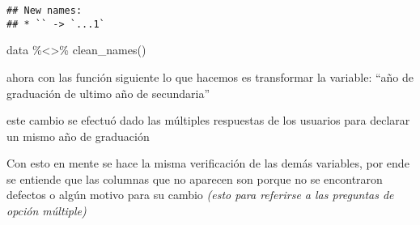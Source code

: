 \documentclass[
]{article}
\newenvironment{Shaded}{\begin{snugshade}}{\end{snugshade}}
\newcommand{\CommentTok}[1]{\textcolor[rgb]{0.56,0.35,0.01}{\textit{#1}}}
\newcommand{\FunctionTok}[1]{\textcolor[rgb]{0.00,0.00,0.00}{#1}}
\newcommand{\NormalTok}[1]{#1}
\newcommand{\OtherTok}[1]{\textcolor[rgb]{0.56,0.35,0.01}{#1}}
\newcommand{\SpecialCharTok}[1]{\textcolor[rgb]{0.00,0.00,0.00}{#1}}
\newcommand{\StringTok}[1]{\textcolor[rgb]{0.31,0.60,0.02}{#1}}
\begin{document}
\begin{verbatim}
## New names:
## * `` -> `...1`
\end{verbatim}

\begin{Shaded}
\begin{Highlighting}[]
\NormalTok{data }\SpecialCharTok{\%\textless{}\textgreater{}\%} \FunctionTok{clean\_names}\NormalTok{()}
\end{Highlighting}
\end{Shaded}

ahora con las función siguiente lo que hacemos es transformar la
variable: ``año de graduación de ultimo año de secundaria''

este cambio se efectuó dado las múltiples respuestas de los usuarios
para declarar un mismo año de graduación

\begin{Shaded}
\end{Shaded}

Con esto en mente se hace la misma verificación de las demás variables,
por ende se entiende que las columnas que no aparecen son porque no se
encontraron defectos o algún motivo para su cambio \emph{(esto para
referirse a las preguntas de opción múltiple) }
\end{document}
